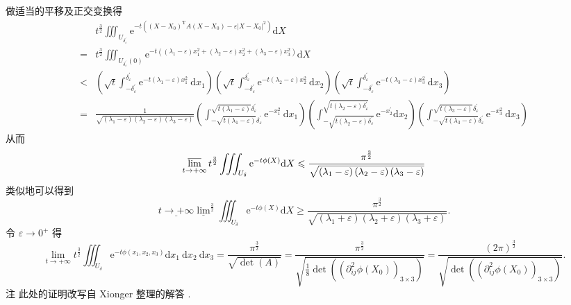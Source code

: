 \documentclass[10pt]{article}
\begin{document}
 做适当的平移及正交变换得 
$$
\begin{aligned}
& t^{\frac{3}{2}} \iiint_{U_{\delta_{\varepsilon}^{\prime}}} \mathrm{e}^{-t\left(\left(X-X_{0}\right)^{\mathrm{T}} A\left(X-X_{0}\right)-\varepsilon\left|X-X_{0}\right|^{2}\right)} \mathrm{d} X \\
=& t^{\frac{3}{2}} \iiint_{U_{\delta_{\varepsilon}^{\prime}}(0)} \mathrm{e}^{-t\left(\left(\lambda_{1}-\varepsilon\right) x_{1}^{2}+\left(\lambda_{2}-\varepsilon\right) x_{2}^{2}+\left(\lambda_{3}-\varepsilon\right) x_{3}^{2}\right)} \mathrm{d} X \\
<&\left(\sqrt{t} \int_{-\delta_{\varepsilon}^{\prime}}^{\delta_{\varepsilon}^{\prime}} \mathrm{e}^{-t\left(\lambda_{1}-\varepsilon\right) x_{1}^{2}} \mathrm{~d} x_{1}\right)\left(\sqrt{t} \int_{-\delta_{\varepsilon}^{\prime}}^{\delta_{\varepsilon}^{\prime}} \mathrm{e}^{-t\left(\lambda_{2}-\varepsilon\right) x_{2}^{2}} \mathrm{~d} x_{2}\right)\left(\sqrt{t} \int_{-\delta_{\varepsilon}^{\prime}}^{\delta_{\varepsilon}^{\prime}} \mathrm{e}^{-t\left(\lambda_{3}-\varepsilon\right) x_{3}^{2}} \mathrm{~d} x_{3}\right) \\
=& \frac{1}{\sqrt{\left(\lambda_{1}-\varepsilon\right)\left(\lambda_{2}-\varepsilon\right)\left(\lambda_{3}-\varepsilon\right)}}\left(\int_{-\sqrt{t\left(\lambda_{1}-\varepsilon\right)} \delta_{\varepsilon}^{\prime}}^{\sqrt{t\left(\lambda_{1}-\varepsilon\right)} \delta_{\varepsilon}^{\prime}} \mathrm{e}^{-x_{1}^{2}} \mathrm{~d} x_{1}\right)\left(\int_{-\sqrt{t\left(\lambda_{2}-\varepsilon\right) \delta_{\varepsilon}^{\prime}}}^{\sqrt{t\left(\lambda_{2}-\varepsilon\right) \delta_{\varepsilon}^{\prime}}} \mathrm{e}^{-x_{2}^{\prime}} \mathrm{d} x_{2}\right)\left(\int_{-\sqrt{t\left(\lambda_{3}-\varepsilon\right)} \delta_{\varepsilon}^{\prime}}^{\sqrt{t\left(\lambda_{3}-\varepsilon\right)} \delta_{\varepsilon}^{\prime}} \mathrm{e}^{-x_{3}^{2}} \mathrm{~d} x_{3}\right)
\end{aligned}
$$
 从而 
$$
\varlimsup_{t \rightarrow+\infty} t^{\frac{3}{2}} \iiint_{U_{\delta}} \mathrm{e}^{-t \phi(X)} \mathrm{d} X \leqslant \frac{\pi^{\frac{3}{2}}}{\sqrt{\left(\lambda_{1}-\varepsilon\right)\left(\lambda_{2}-\varepsilon\right)\left(\lambda_{3}-\varepsilon\right)}}
$$
 类似地可以得到 
$$
\underline{t \rightarrow+\infty} \underline{\lim }^{\frac{3}{2}} \iiint_{U_{\delta}} \mathrm{e}^{-t \phi(X)} \mathrm{d} X \geqslant \frac{\pi^{\frac{3}{2}}}{\sqrt{\left(\lambda_{1}+\varepsilon\right)\left(\lambda_{2}+\varepsilon\right)\left(\lambda_{3}+\varepsilon\right)}} .
$$
 令  $\varepsilon \rightarrow 0^{+}$ 得 
$$
\lim _{t \rightarrow+\infty} t^{\frac{3}{2}} \iiint_{U_{\delta}} \mathrm{e}^{-t \phi\left(x_{1}, x_{2}, x_{3}\right)} \mathrm{d} x_{1} \mathrm{~d} x_{2} \mathrm{~d} x_{3}=\frac{\pi^{\frac{3}{2}}}{\sqrt{\operatorname{det}(A)}}=\frac{\pi^{\frac{3}{2}}}{\sqrt{\frac{1}{8} \operatorname{det}\left(\left(\partial_{i j}^{2} \phi\left(X_{0}\right)\right)_{3 \times 3}\right)}}=\frac{(2 \pi)^{\frac{3}{2}}}{\sqrt{\operatorname{det}\left(\left(\partial_{i j}^{2} \phi\left(X_{0}\right)\right)_{3 \times 3}\right)}} .
$$
 注   此处的证明改写自  Xionger  整理的解答 .
\end{document}
